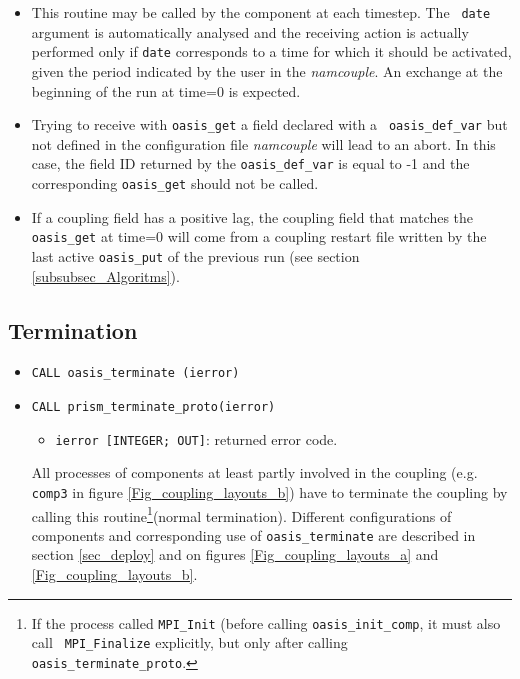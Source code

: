 \begin{itemize}

\item This routine may be called by the component at each timestep. The {\tt
  date} argument is automatically analysed and the receiving action is
actually performed only if {\tt date} corresponds to a time for which
it should be activated, given the period indicated by the user in the
{\it namcouple}. An exchange at the beginning of the run at time=0 is
expected.

\item Trying to receive with {\tt oasis\_get} a field declared with a {\tt
  oasis\_def\_var} but not defined in the configuration file {\it
  namcouple} will lead to an abort. In this case, the field ID
returned by the {\tt oasis\_def\_var} is equal to -1 and the
corresponding {\tt oasis\_get} should not be called. 

\item If a coupling field has a positive lag, the coupling field that
  matches the {\tt oasis\_get} at time=0 will come from a coupling
  restart file written by the last active {\tt oasis\_put} of the
  previous run (see section \ref{subsubsec_Algoritms}). 

\end{itemize}

\subsection{Termination}
\label{subsubsec_Termination}

\begin{itemize}

\item {\tt CALL oasis\_terminate (ierror)}
\item {\tt CALL prism\_terminate\_proto(ierror)}
  \begin{itemize}
  \item {\tt ierror [INTEGER; OUT]}: returned error code.
  \end{itemize}
All processes of components at least partly involved in the coupling (e.g. {\tt comp3} in figure
    \ref{Fig_coupling_layouts_b}) have to terminate the coupling by
  calling this routine\footnote{If the process called {\tt MPI\_Init}
    (before calling {\tt oasis\_init\_comp}, it must also call {\tt
      MPI\_Finalize} explicitly, but only after calling {\tt
      oasis\_terminate\_proto}.}(normal termination). Different configurations of components and corresponding use of {\tt oasis\_terminate} are described in section \ref{sec_deploy} and on figures \ref{Fig_coupling_layouts_a} and \ref{Fig_coupling_layouts_b}.

  

\end{itemize}

